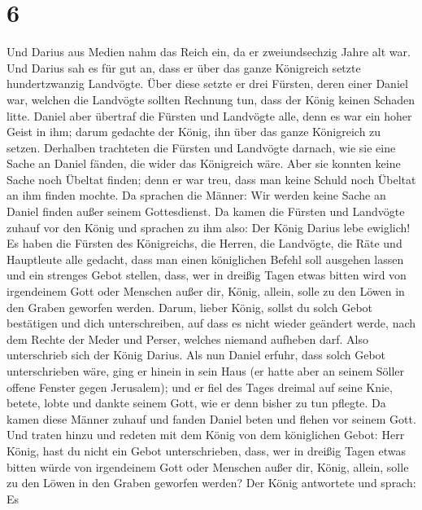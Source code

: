 \hypertarget{section-5}{%
\section{6}\label{section-5}}

 Und Darius aus Medien nahm das Reich ein, da er
zweiundsechzig Jahre alt war.  Und Darius sah es für gut
an, dass er über das ganze Königreich setzte hundertzwanzig Landvögte.
 Über diese setzte er drei Fürsten, deren einer Daniel
war, welchen die Landvögte sollten Rechnung tun, dass der König keinen
Schaden litte.  Daniel aber übertraf die Fürsten und
Landvögte alle, denn es war ein hoher Geist in ihm; darum gedachte der
König, ihn über das ganze Königreich zu setzen.  Derhalben
trachteten die Fürsten und Landvögte darnach, wie sie eine Sache an
Daniel fänden, die wider das Königreich wäre. Aber sie konnten keine
Sache noch Übeltat finden; denn er war treu, dass man keine Schuld noch
Übeltat an ihm finden mochte.  Da sprachen die Männer: Wir
werden keine Sache an Daniel finden außer seinem Gottesdienst.
 Da kamen die Fürsten und Landvögte zuhauf vor den König
und sprachen zu ihm also: Der König Darius lebe ewiglich! 
Es haben die Fürsten des Königreichs, die Herren, die Landvögte, die
Räte und Hauptleute alle gedacht, dass man einen königlichen Befehl soll
ausgehen lassen und ein strenges Gebot stellen, dass, wer in dreißig
Tagen etwas bitten wird von irgendeinem Gott oder Menschen außer dir,
König, allein, solle zu den Löwen in den Graben geworfen werden.
 Darum, lieber König, sollst du solch Gebot bestätigen und
dich unterschreiben, auf dass es nicht wieder geändert werde, nach dem
Rechte der Meder und Perser, welches niemand aufheben darf.
 Also unterschrieb sich der König Darius. 
Als nun Daniel erfuhr, dass solch Gebot unterschrieben wäre, ging er
hinein in sein Haus (er hatte aber an seinem Söller offene Fenster gegen
Jerusalem); und er fiel des Tages dreimal auf seine Knie, betete, lobte
und dankte seinem Gott, wie er denn bisher zu tun pflegte.
 Da kamen diese Männer zuhauf und fanden Daniel beten und
flehen vor seinem Gott.  Und traten hinzu und redeten mit
dem König von dem königlichen Gebot: Herr König, hast du nicht ein Gebot
unterschrieben, dass, wer in dreißig Tagen etwas bitten würde von
irgendeinem Gott oder Menschen außer dir, König, allein, solle zu den
Löwen in den Graben geworfen werden? Der König antwortete und sprach: Es
